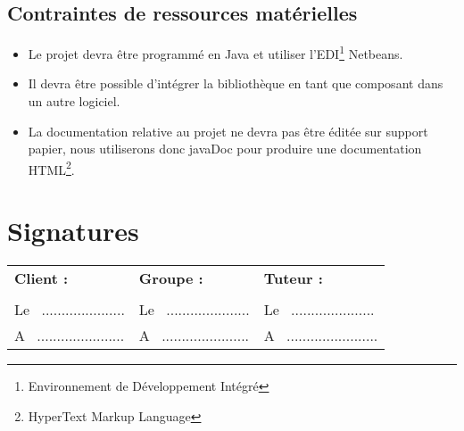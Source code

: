 \documentclass[12pt,a4paper,openany]{article}
\begin{document}
	\subsection{Contraintes de ressources matérielles}
	\begin{itemize}
		\item Le projet devra être programmé en Java et utiliser l'EDI\footnote{Environnement de Développement Intégré} Netbeans. 
		\item Il devra être possible d'intégrer la bibliothèque en tant que composant dans un autre logiciel. 
		\item La documentation relative au projet ne devra pas être éditée sur support papier, nous utiliserons donc javaDoc pour produire une documentation 
	HTML\footnote{HyperText Markup Language}.  
	\end{itemize}
	

\section*{Signatures}
\vspace{20px}
\begin{tabular}[center]{p{175px}p{175px}p{175px}}
  \textbf{Client :} & \textbf{Groupe :} & \textbf{Tuteur :} \\
  \\
  Le ~..................... & Le ~..................... & Le ~..................... \\
  A ~...................... & A ~...................... & A ~....................... \\
\end{tabular}
\end{document}
